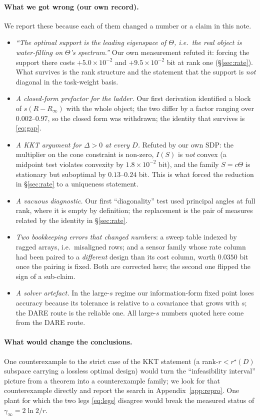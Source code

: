 \documentclass[journal]{IEEEtran}
\theoremstyle{remark}
\begin{document}
\paragraph{What we got wrong (our own record).} We report these because each of
them changed a number or a claim in this note.
\begin{itemize}\itemsep2pt
\item \emph{``The optimal support is the leading eigenspace of $\Theta$, i.e.\ the
real object is water-filling on $\Theta$'s spectrum.''} Our own measurement
refuted it: forcing the support there costs $+5.0\times10^{-2}$ and
$+9.5\times10^{-2}$ bit at rank one (\S\ref{sec:rate}). What survives is the rank
structure and the statement that the support is \emph{not} diagonal in the
task-weight basis.
\item \emph{A closed-form prefactor for the ladder.} Our first derivation
identified a block of $s(R-R_\infty)$ with the whole object; the two differ by a
factor ranging over $0.002$--$0.97$, so the closed form was withdrawn; the
identity that survives is \eqref{eq:gap}.
\item \emph{A KKT argument for $\Delta>0$ at every $D$.} Refuted by our own SDP:
the multiplier on the cone constraint is non-zero, $I(S)$ is \emph{not} convex
(a midpoint test violates convexity by $1.8\times10^{-2}$ bit), and the
family $S=c\Theta$ is stationary but suboptimal by $0.13$--$0.24$ bit. This is
what forced the reduction in \S\ref{sec:rate} to a uniqueness statement.
\item \emph{A vacuous diagnostic.} Our first ``diagonality'' test used principal
angles at full rank, where it is empty by definition; the replacement is the
pair of measures related by the identity in \S\ref{sec:rate}.
\item \emph{Two bookkeeping errors that changed numbers}: a sweep table indexed by
ragged arrays, i.e.\ misaligned rows; and a sensor family whose rate column had
been paired to a \emph{different} design than its cost column, worth $0.0350$ bit
once the pairing is fixed. Both are corrected here; the second one flipped the
sign of a sub-claim.
\item \emph{A solver artefact.} In the large-$s$ regime our information-form fixed
point loses accuracy because its tolerance is relative to a covariance that grows
with $s$; the DARE route is the reliable one. All large-$s$ numbers quoted here
come from the DARE route.
\end{itemize}

\paragraph{What would change the conclusions.} One counterexample to the strict
case of the KKT statement (a rank-$r<r^{\star}(D)$ subspace carrying a lossless
optimal design) would turn the ``infeasibility interval'' picture from a theorem
into a counterexample family; we look for that counterexample directly and report
the search in Appendix~\ref{app:repro}. One plant for which the two legs
\eqref{eq:legs} disagree would break the measured status of
$\gamma_\infty=2\ln2/r$.
\end{document}
